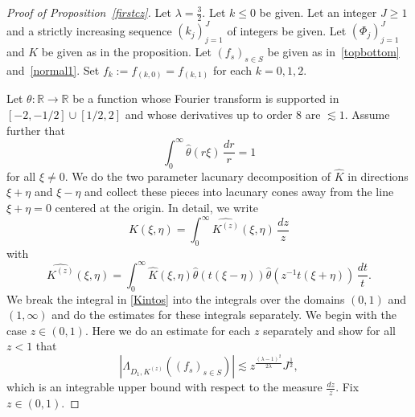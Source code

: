 \documentclass[12pt,reqno]{amsart}
\theoremstyle{plain}
\theoremstyle{definition}
\numberwithin{equation}{section}
\newcommand{\R}{{\mathbb R}}
\def\wh{\widehat}
\begin{document}
\begin{proof}[Proof of Proposition~\ref{firstcz}]
Let $\lambda=\frac{3}{2}$. 
Let $k\le 0$ be given. Let an integer $J \geq 1$ and a strictly increasing sequence $(k_j)_{j=1}^J$ of integers be given. Let $(\Phi_j)_{j=1}^J$ and $K$ be given as in the proposition.
Let $(f_s)_{s\in S}$ be given as in~\eqref{topbottom} and~\eqref{normal1}.
Set $f_{k}:=f_{(k,0)}=f_{(k,1)}$ for each $k=0,1,2$.


Let $\theta: \R \rightarrow \R$ be a function whose Fourier transform is supported in   $[-2,-1/2] \cup [1/2,2]$ and whose derivatives up to order $8$ are $\lesssim 1$. Assume further that \[\int_0^\infty \wh{\theta}(r\xi)\,\frac{dr}{r}=1\] for all $\xi \neq 0$.
We do the two parameter lacunary decomposition of $\widehat{K}$
in directions $\xi+\eta$ and $\xi-\eta$ and collect these pieces into  lacunary cones away from the line $\xi+\eta=0$ centered at the origin. In detail, we write
\begin{equation}\label{Kintos}
\wh{K}(\xi,\eta)=\int_0^\infty \wh{K^{(z)}} (\xi,\eta)\,\frac{dz}{z}
\end{equation}
with 
\begin{equation}\label{defKs}
\wh{K^{(z)}}(\xi,\eta)=\int_0^\infty 
\wh{K}(\xi,\eta) \wh{\theta}(t(\xi-\eta)) \wh{\theta}(z^{-1}t(\xi+\eta))
\,\frac{dt}{t}.
\end{equation}
We break the integral in \eqref{Kintos} into the integrals over the domains $(0,1)$ and $(1,\infty)$
and do the estimates for these integrals separately.  
We begin with the case $z\in (0,1)$. Here we do an estimate for each $z$ separately
and show for all $z< 1$ that
\begin{equation}\label{E:s-less-1}
|\Lambda_{D_1,K^{(z)}}((f_s)_{s\in S})| \lesssim z^{\frac{(\lambda-1)^2}{2\lambda}} J^{\frac{1}{2}},
\end{equation}
which is an integrable upper bound with respect to the measure $\frac{dz}{z}$. 
Fix $z\in (0,1)$.



\end{proof}
\end{document}
